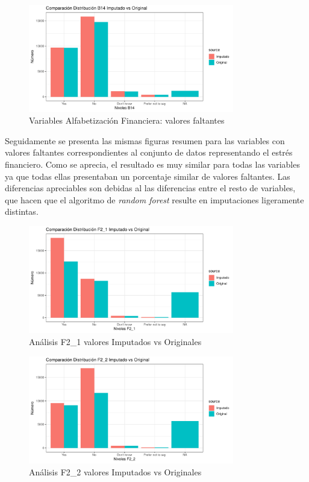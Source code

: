 \documentclass[a4paper, 11pt]{article}
\begin{document}
\begin{figure}[ht]
    \centering
    \includegraphics[width=0.8\textwidth]{images/Analysis_MV_B14.pdf} 
    \caption{Variables Alfabetización Financiera: valores faltantes}
    \label{fig:Analysis_MV_B14}
\end{figure}

Seguidamente se presenta las mismas figuras resumen para las variables con valores faltantes 
correspondientes al conjunto de datos representando el estrés financiero. Como se aprecia, el 
resultado es muy similar para todas las variables ya que todas ellas presentaban un 
porcentaje similar de valores faltantes. Las diferencias apreciables son debidas al las 
diferencias entre el resto de variables, que hacen que el algoritmo de \textit{random forest} 
resulte en imputaciones ligeramente distintas.

\begin{figure}[ht]
    \centering
    \includegraphics[width=0.8\textwidth]{images/Analysis_MV_F2_1.pdf} 
    \caption{Análisis F2\_1 valores Imputados vs Originales}
    \label{fig:Analysis_MV_F2_1}
\end{figure}

\begin{figure}[ht]
    \centering
    \includegraphics[width=0.8\textwidth]{images/Analysis_MV_F2_2.pdf} 
    \caption{Análisis F2\_2 valores Imputados vs Originales}
    \label{fig:Analysis_MV_F2_2}
\end{figure}
\end{document}
